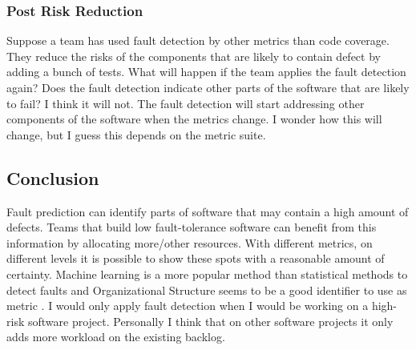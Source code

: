 \subsubsection*{Post Risk Reduction}

Suppose a team has used fault detection by other metrics than code coverage.
They reduce the risks of the components that are likely to contain defect by adding a bunch of tests.
What will happen if the team applies the fault detection again?
Does the fault detection indicate other parts of the software that are likely to fail?
I think it will not.
The fault detection will start addressing other components of the software when the metrics change.
I wonder how this will change, but I guess this depends on the metric suite.

\subsection*{Conclusion}

Fault prediction can identify parts of software that may contain a high amount of defects.
Teams that build low fault-tolerance software can benefit from this information by allocating more/other resources.
With different metrics, on different levels it is possible to show these spots with a reasonable amount of certainty.
Machine learning is a more popular method than statistical methods to detect faults \autocite[7347]{Catal20097346} and Organizational Structure seems to be a good identifier to use as metric \autocite{MAKING_SOFTWARE}.
I would only apply fault detection when I would be working on a high-risk software project.
Personally I think that on other software projects it only adds more workload on the existing backlog.
